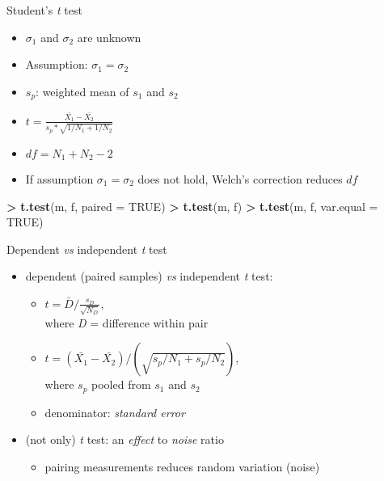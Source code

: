 \documentclass[
  ignorenonframetext,
]{beamer}
\newenvironment{Shaded}{\begin{snugshade}}{\end{snugshade}}
\newcommand{\AttributeTok}[1]{\textcolor[rgb]{0.13,0.29,0.53}{#1}}
\newcommand{\ConstantTok}[1]{\textcolor[rgb]{0.56,0.35,0.01}{#1}}
\newcommand{\FunctionTok}[1]{\textcolor[rgb]{0.13,0.29,0.53}{\textbf{#1}}}
\newcommand{\NormalTok}[1]{#1}
\newcommand{\SpecialCharTok}[1]{\textcolor[rgb]{0.81,0.36,0.00}{\textbf{#1}}}
\providecommand{\tightlist}{%
  \setlength{\itemsep}{0pt}\setlength{\parskip}{0pt}}
\begin{document}
\begin{frame}[fragile]{Student's \emph{t} test}
\label{students-t-test}
\begin{itemize}
\tightlist
\item
  \(\sigma_1\) and \(\sigma_2\) are unknown
\item
  Assumption: \(\sigma_1 = \sigma_2\)
\item
  \(s_p\): weighted mean of \(s_1\) and \(s_2\)
\item
  \(t = \frac{\bar{X_1} - \bar{X_2}}{s_p * \sqrt{1/N_1 + 1/N_2}}\)
\item
  \(df = N_1 + N_2 - 2\)
\item
  If assumption \(\sigma_1 = \sigma_2\) does not hold, Welch's
  correction reduces \(df\)
\end{itemize}

\begin{Shaded}
\begin{Highlighting}[]
\SpecialCharTok{\textgreater{}} \FunctionTok{t.test}\NormalTok{(m, f, }\AttributeTok{paired =} \ConstantTok{TRUE}\NormalTok{)}
\SpecialCharTok{\textgreater{}} \FunctionTok{t.test}\NormalTok{(m, f)}
\SpecialCharTok{\textgreater{}} \FunctionTok{t.test}\NormalTok{(m, f, }\AttributeTok{var.equal =} \ConstantTok{TRUE}\NormalTok{)}
\end{Highlighting}
\end{Shaded}
\end{frame}

\begin{frame}{Dependent \emph{vs} independent \emph{t} test}
\label{dependent-vs-independent-t-test}
\begin{itemize}
\tightlist
\item
  dependent (paired samples) \emph{vs} independent \emph{t} test:

  \begin{itemize}
  \tightlist
  \item
    \(t = \bar{D}/\frac{s_D}{\sqrt{N_D}}\),\\
    where \emph{D} = difference within pair
  \item
    \(t = (\bar{X_1} - \bar{X_2})/(\sqrt{s_p/N_1 + s_p/N_2})\),\\
    where \(s_p\) pooled from \(s_1\) and \(s_2\)
  \item
    denominator: \emph{standard error}
  \end{itemize}
\item
  (not only) \emph{t} test: an \emph{effect} to \emph{noise} ratio

  \begin{itemize}
  \tightlist
  \item
    pairing measurements reduces random variation (noise)
  \end{itemize}
\end{itemize}
\end{frame}
\end{document}
